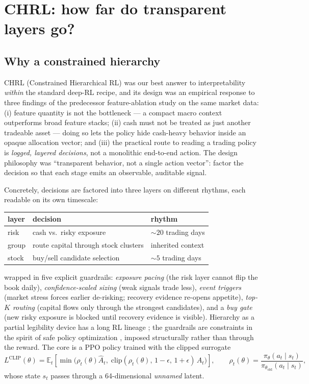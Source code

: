 \documentclass[11pt]{article}
\newcommand{\E}{\mathbb{E}}
\begin{document}
\section{CHRL: how far do transparent layers go?}
\label{sec:chrl}

\subsection{Why a constrained hierarchy}
\label{sec:chrlwhy}

CHRL (Constrained Hierarchical RL) was our best answer to interpretability \emph{within} the
standard deep-RL recipe, and its design was an empirical response to three findings of the
predecessor feature-ablation study on the same market data: (i) feature quantity is not the
bottleneck --- a compact macro context outperforms broad feature stacks; (ii) cash must not be
treated as just another tradeable asset --- doing so lets the policy hide cash-heavy behavior
inside an opaque allocation vector; and (iii) the practical route to reading a trading policy is
\emph{logged, layered decisions}, not a monolithic end-to-end action. The design philosophy was
``transparent behavior, not a single action vector'': factor the decision so that each stage
emits an observable, auditable signal.

Concretely, decisions are factored into three layers on different rhythms, each readable on its
own timescale:
\begin{center}\small
\begin{tabular}{lll}
\toprule
layer & decision & rhythm \\
\midrule
risk & cash vs.\ risky exposure & ${\sim}20$ trading days \\
group & route capital through stock clusters & inherited context \\
stock & buy/sell candidate selection & ${\sim}5$ trading days \\
\bottomrule
\end{tabular}
\end{center}
wrapped in five explicit guardrails: \emph{exposure pacing} (the risk layer cannot flip the book
daily), \emph{confidence-scaled sizing} (weak signals trade less), \emph{event triggers} (market
stress forces earlier de-risking; recovery evidence re-opens appetite), \emph{top-$K$ routing}
(capital flows only through the strongest candidates), and a \emph{buy gate} (new risky exposure
is blocked until recovery evidence is visible). Hierarchy as a partial legibility device has a
long RL lineage \citep{sutton1999options,bacon2017option}; the guardrails are constraints in the
spirit of safe policy optimization \citep{achiam2017}, imposed structurally rather than through
the reward. The core is a PPO policy \citep{schulman2017ppo} trained with the clipped surrogate
\begin{equation}
L^{\text{CLIP}}(\theta) = \E_t\!\left[\min\!\big(\rho_t(\theta)\hat{A}_t,\;
\text{clip}(\rho_t(\theta),\,1{-}\epsilon,\,1{+}\epsilon)\,\hat{A}_t\big)\right],
\qquad \rho_t(\theta) = \frac{\pi_\theta(a_t \mid s_t)}{\pi_{\theta_{\text{old}}}(a_t \mid s_t)},
\label{eq:ppo}
\end{equation}
whose state $s_t$ passes through a 64-dimensional \emph{unnamed} latent.
\end{document}
